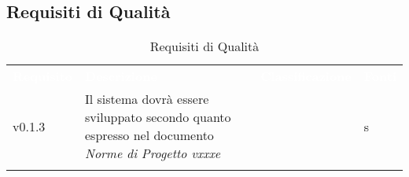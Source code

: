 \subsection{Requisiti di Qualità}


\renewcommand{\arraystretch}{1.5}
\begin{longtable}{ m{}<{\centering}  m{}<{\centering}  m{}<{\centering}  m{}<{\centering}}
	\rowcolor{darkblue}
	\textcolor{white}{\textbf{Requisito}} &\textcolor{white}{\textbf{Descrizione}}& \textcolor{white}{\textbf{Classificazione}} & \textcolor{white}{\textbf{Fonti}}\\ 

	v0.1.3 & Il sistema dovrà essere sviluppato secondo quanto espresso nel documento \textit{Norme di Progetto vxxxe} & \Ob & s\\	
			 

	\caption{Requisiti di Qualità}
\end{longtable}

\clearpage
